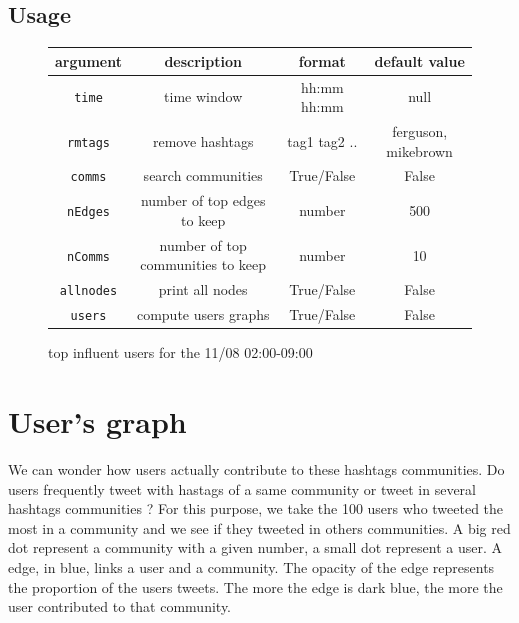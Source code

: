 \documentclass[a4paper,12pt]{report}
\begin{document}
\subsection{Usage}
\begin{figure}[H]
  \centering
\begin{tabular}{|c|c|c|c|}
\hline
argument & description & format & default value \\ \hline
\texttt{time} & time window & hh:mm hh:mm & null \\ \hline
\texttt{rmtags} & remove hashtags & tag1 tag2 ..  & ferguson, mikebrown \\ \hline
\texttt{comms} & search communities & True/False & False \\ \hline
\texttt{nEdges} & number of top edges to keep & number & 500 \\ \hline
\texttt{nComms} & number of top communities to keep & number & 10\\ \hline
\texttt{allnodes} & print all nodes & True/False & False \\ \hline
\texttt{users} & compute users graphs & True/False & False \\ \hline
\hline
\end{tabular}
\caption{top influent users for the 11/08 02:00-09:00}
\end{figure}

\newpage
\section{User's graph}

We can wonder how users actually contribute to these hashtags communities. Do users frequently tweet with hastags of a same community or tweet in several hashtags communities ? For this purpose, we take the 100 users who tweeted the most in a community and we see if they tweeted in others communities. A big red dot represent a community with a given number, a small dot represent a user. A edge, in blue, links a user and a community. The opacity of the edge represents the proportion of the users tweets. The more the edge is dark blue, the more the user contributed to that community. 
\end{document}
